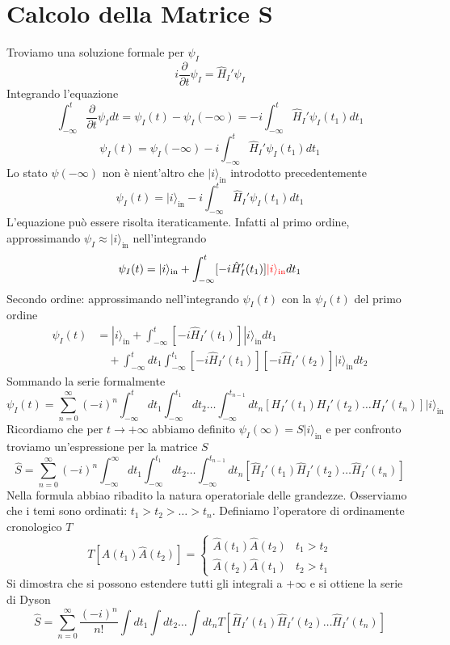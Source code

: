 \section{Calcolo della Matrice S}
Troviamo una soluzione formale per $\psi_I$
$$
i\frac{\partial}{\partial t}\psi_I = \hat{H}_I'\psi_I
$$
Integrando l'equazione
$$
\int_{-\infty}^t \frac{\partial}{\partial t}\psi_I dt = \psi_I(t) - \psi_I(-\infty) = -i\int_{-\infty}^t \hat{H}_I'\psi_I(t_1) dt_1
$$
$$
\psi_I(t) = \psi_I(-\infty) - i\int_{-\infty}^t \hat{H}_I'\psi_I(t_1) dt_1
$$
Lo stato $\psi(-\infty)$ non è nient'altro che $|i\rangle_\text{in}$ introdotto precedentemente
$$
\psi_I(t) = |i\rangle_{\text{in}} - i\int_{-\infty}^t \hat{H}_I'\psi_I(t_1) dt_1
$$
L'equazione può essere risolta iteraticamente. Infatti al primo ordine, approssimando $\psi_I\approx|i\rangle_\text{in}$ nell'integrando
$$
\psi_I(t) = |i\rangle_{\text{in}} + \int_{-\infty}^t [-i\hat{H}_I'(t_1)] \textcolor{red}{|i\rangle_{\text{in}}} dt_1
$$
Secondo ordine: approssimando nell'integrando $\psi_I(t)$ con la $\psi_I(t)$ del primo ordine
\begin{align*}
\psi_I(t) &= |i\rangle_{\text{in}} + \int_{-\infty}^t [-i\hat{H}_I'(t_1)] |i\rangle_{\text{in}} dt_1 \\
&\quad + \int_{-\infty}^t dt_1 \int_{-\infty}^{t_1} [-i\hat{H}_I'(t_1)] [-i\hat{H}_I'(t_2)] |i\rangle_{\text{in}} dt_2
\end{align*}
Sommando la serie formalmente
$$
\psi_I(t) = \sum_{n=0}^\infty (-i)^n \int_{-\infty}^t dt_1 \int_{-\infty}^{t_1} dt_2 \dots \int_{-\infty}^{t_{n-1}} dt_n [H_I'(t_1) H_I'(t_2) \dots H_I'(t_n)] |i\rangle_{\text{in}}
$$
Ricordiamo che per $t\to+\infty$ abbiamo definito $\psi_I(\infty)=S|i\rangle_\text{in}$ e per confronto troviamo un'espressione per la matrice $S$
$$
\hat{S} = \sum_{n=0}^\infty (-i)^n \int_{-\infty}^{\infty} dt_1 \int_{-\infty}^{t_1} dt_2 \dots \int_{-\infty}^{t_{n-1}} dt_n [\hat{H}_I'(t_1) \hat{H}_I'(t_2) \dots \hat{H}_I'(t_n)]
$$
Nella formula abbiao ribadito la natura operatoriale delle grandezze. Osserviamo che i temi sono ordinati: $t_1 > t_2 > \dots > t_n$. Definiamo l'operatore di ordinamente cronologico $T$
$$
T[\hat{A}(t_1) \hat{A}(t_2)] = \begin{cases} \hat{A}(t_1) \hat{A}(t_2) & t_1 > t_2 \\ \hat{A}(t_2) \hat{A}(t_1) & t_2 > t_1 \end{cases}
$$
Si dimostra che si possono estendere tutti gli integrali a $+\infty$ e si ottiene la serie di Dyson
$$
\hat{S} = \sum_{n=0}^\infty \frac{(-i)^n}{n!} \int dt_1 \int dt_2 \dots \int dt_n T[\hat{H}_I'(t_1) \hat{H}_I'(t_2) \dots \hat{H}_I'(t_n)]
$$
